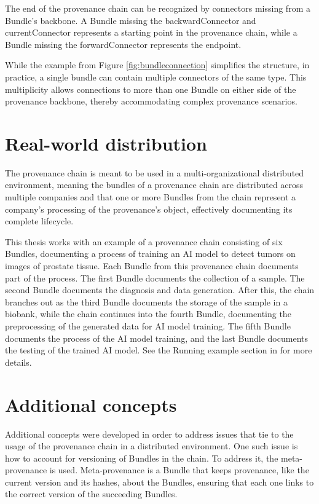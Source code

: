 \documentclass[
  digital,     %
  oneside,     %
  nosansbold,  %
  nocolorbold, %
  lof,         %
  lot,         %
]{fithesis4}
\begin{document}
The end of the provenance chain can be recognized by connectors missing from a Bundle's backbone. A Bundle missing the backwardConnector and currentConnector represents a starting point in the provenance chain, while a Bundle missing the forwardConnector represents the endpoint. \cite{provchain}

While the example from Figure \ref{fig:bundleconnection} simplifies the structure, in practice, a single bundle can contain multiple connectors of the same type. This multiplicity allows connections to more than one Bundle on either side of the provenance backbone, thereby accommodating complex provenance scenarios.

\shorthandon{-}

\section{Real-world distribution}
The provenance chain is meant to be used in a multi-organizational distributed environment, meaning the bundles of a provenance chain are distributed across multiple companies and that one or more Bundles from the chain represent a company's processing of the provenance's object, effectively documenting its complete lifecycle.

\label{t-aiexample} This thesis works with an example of a provenance chain consisting of six Bundles, documenting a process of training an AI model to detect tumors on images of prostate tissue. Each Bundle from this provenance chain documents part of the process. The first Bundle documents the collection of a sample. The second Bundle documents the diagnosis and data generation. After this, the chain branches out as the third Bundle documents the storage of the sample in a biobank, while the chain continues into the fourth Bundle, documenting the preprocessing of the generated data for AI model training. The fifth Bundle documents the process of the AI model training, and the last Bundle documents the testing of the trained AI model. See the Running example section in \cite{research} for more details.

\section{Additional concepts}
Additional concepts were developed in order to address issues that tie to the usage of the provenance chain in a distributed environment. One such issue is how to account for versioning of Bundles in the chain. To address it, the meta-provenance is used. Meta-provenance is a Bundle that keeps provenance, like the current version and its hashes, about the Bundles, ensuring that each one links to the correct version of the succeeding Bundles. \cite{metaprov}
\end{document}
